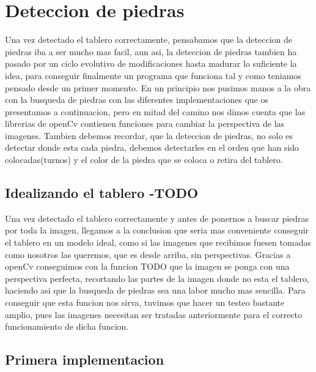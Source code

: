 \documentclass[12pt,a4paper]{report}
\begin{document}
\section{Deteccion de piedras}
Una vez detectado el tablero correctamente, pensabamos que la deteccion de piedras iba a ser mucho mas facil, aun asi, la deteccion de piedras tambien ha pasado por un ciclo evolutivo de modificaciones hasta madurar lo suficiente la idea, para conseguir finalmente un programa que funciona tal y como teniamos pensado desde un primer momento.
En un principio nos pusimos manos a la obra con la busqueda de piedras con las diferentes implementaciones que os presentamos a continuacion, pero en mitad del camino nos dimos cuenta que las librerias de openCv contienen funciones para cambiar la perspectiva de las imagenes.
Tambien debemos recordar, que la deteccion de piedras, no solo es detectar donde esta cada piedra, debemos detectarles en el orden que han sido colocadas(turnos) y el color de la piedra que se coloca o retira del tablero.

\subsection{Idealizando el tablero -TODO}%

Una vez detectado el tablero correctamente y antes de ponernos a buscar piedras por toda la imagen, llegamos a la conclusion que seria mas conveniente conseguir el tablero en un modelo ideal, como si las imagenes que recibimos fuesen tomadas como nosotros las queremos, que es desde arriba, sin perspectivas. 
Gracias a openCv conseguimos con la funcion TODO que la imagen se ponga con una perspectiva perfecta, recortando las partes de la imagen donde no esta el tablero, haciendo asi que la busqueda de piedras sea una labor mucho mas sencilla. 
Para conseguir que esta funcion nos sirva, tuvimos que hacer un testeo bastante amplio, pues las imagenes necesitan ser tratadas anteriormente para el correcto funcionamiento de dicha funcion.

\subsection{Primera implementacion}%
\end{document}
